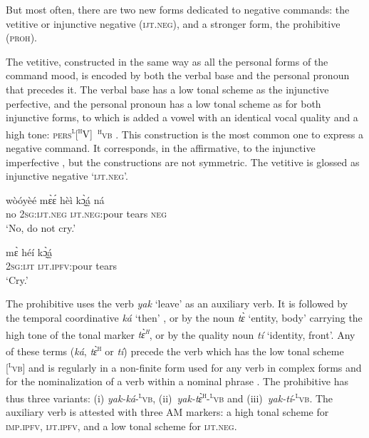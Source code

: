 \documentclass[output=paper,colorlinks=true, citecolor=brown]{langscibook}
\begin{document}
But most often, there are two new forms dedicated to negative commands: the vetitive or injunctive negative (\textsc{ijt.neg}), and a stronger form, the prohibitive (\textsc{proh}). 

The vetitive, constructed in the same way as all the personal forms of the command mood, is encoded by both the verbal base and the personal pronoun that precedes it. The verbal base has a low tonal scheme as the injunctive perfective, and the personal pronoun has a low tonal scheme as for both injunctive forms, to which is added a vowel with an identical vocal quality and a high tone: \mbox{\textsc{pers}\textsc{\textsuperscript{l}[\textsuperscript{h}V]}   \textsuperscript{\textsc{h}}\textsc{vb}}
. This construction is the most common one to express a negative command. It corresponds, in the affirmative, to the injunctive imperfective , but the constructions are not symmetric. The vetitive is glossed as injunctive negative ‘\textsc{ijt.neg}’. 

\ea\label{ex:gba:22}
    \gll wòóyèé mɛ̀ɛ́ hèì kɔ̰̀á̰ ná  \\ 
         no \textsc{2sg:ijt.neg} \textsc{ijt.neg:}pour tears \textsc{neg}  \\
    \glt ‘No, do not cry.’
\z 

\ea\label{ex:gba:23}
    \gll mɛ̀ héí kɔ̰̀á̰ \\ 
         \textsc{2sg:ijt} \textsc{ijt.ipfv:}pour tears \\
    \glt ‘Cry.’
\z 

The prohibitive uses the verb \textit{yak} ‘leave’ as an auxiliary verb. It is followed by the temporal coordinative \textit{ká} ‘then’ , or by the noun \textit{tɛ̀} ‘entity, body’  carrying the high tone of the tonal marker \textit{tɛ̀\textsuperscript{\textsc{h}}}, or by the quality noun \textit{tí} ‘identity, front’. Any of these terms (\textit{ká}, \textit{tɛ̀}\textsuperscript{\textsc{h}} or \textit{tí}) precede the verb which has the low tonal scheme [\textsuperscript{\textsc{l}}\textsc{vb}] and is regularly in a non-finite form used for any verb in complex forms and for the nominalization of a verb within a nominal phrase . The prohibitive has thus three variants: (i) \textit{yak-ká}{}-\textsuperscript{\textsc{l}}\textsc{vb}, (ii)~\textit{yak-tɛ̀}\textsuperscript{\textsc{h}}-\textsuperscript{\textsc{l}}\textsc{vb} and (iii)~\textit{yak-tí}{}-\textsuperscript{\textsc{l}}\textsc{vb}. The auxiliary verb is attested with three AM markers: a high tonal scheme for \textsc{imp.ipfv}, \textsc{ijt.ipfv}, and a low tonal scheme for \textsc{ijt.neg}. 
\end{document}

